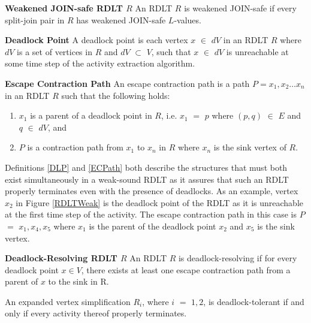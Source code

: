\begin{defn}\textbf{Weakened JOIN-safe RDLT $ R $}
    \label{WJRDLT}
    An RDLT $ R $ is weakened JOIN-safe if every split-join pair in $ R $ has weakened JOIN-safe $ L $-values.
\end{defn}

\begin{defn}\textbf{Deadlock Point}
    \label{DLP}
    A deadlock point is each vertex $ x $ $ \in $ $ dV $ in an RDLT $ R $ where $ dV $ is a set of vertices in $ R $ and $ dV $ $ \subset $ $ V $, such that $ x $ $ \in $ $ dV $ is unreachable at some time step of the activity extraction algorithm.
\end{defn}

\begin{defn}\textbf{Escape Contraction Path}
    \label{ECPath}
    An escape contraction path is a path $ P = x_1, x_2 \ldots x_n $ in an RDLT $ R $ such that the following holds:
    \begin{enumerate}
        \item $ x_1 $ is a parent of a deadlock point in $ R $, i.e. $ x_1 $ $ = $ $ p $ where $ (p,q) $ $ \in $ $ E $ and $ q $ $ \in $ $ dV $, and
        \item $ P $ is a contraction path from $ x_1 $ to $ x_n $ in $ R $ where $ x_n $ is the sink vertex of $ R $.
    \end{enumerate}
\end{defn}

Definitions \ref{DLP} and \ref{ECPath} both describe the structures that must both exist simultaneously in a weak-sound RDLT as it assures that such an RDLT properly terminates even with the presence of deadlocks. As an example, vertex $ x_2 $ in Figure \ref{RDLTWeak} is the deadlock point of the RDLT as it is unreachable at the first time step of the activity. The escape contraction path in this case is $ P $ $ = $ $ x_1, x_4, x_5 $ where $ x_1 $ is the parent of the deadlock point $ x_2 $ and $ x_5 $ is the sink vertex.

\begin{defn}\textbf{Deadlock-Resolving RDLT $ R $}
    \label{DLResolving}
    An RDLT $ R $ is deadlock-resolving if for every deadlock point $ x \in V $, there exists at least one escape contraction path from a parent of $ x $ to the sink in R.
\end{defn}

\begin{lem}
    An expanded vertex simplification $ R_i $, where $ i $ $ = $ $ 1, 2 $, is deadlock-tolerant if and only if every activity thereof properly terminates.
\end{lem}

